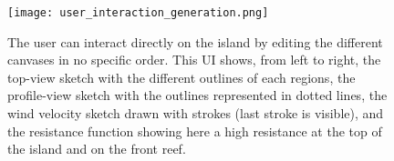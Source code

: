\begin{figure}[tb]
    \centering
    \texttt{[image: user\_interaction\_generation.png]}
    \caption{The user can interact directly on the island by editing the different canvases in no specific order. This UI shows, from left to right, the top-view sketch with the different outlines of each regions, the profile-view sketch with the outlines represented in dotted lines, the wind velocity sketch drawn with strokes (last stroke is visible), and the resistance function showing here a high resistance at the top of the island and on the front reef.}
    \label{fig:coral-island_wind-from-strokes-interaction}
\end{figure}











